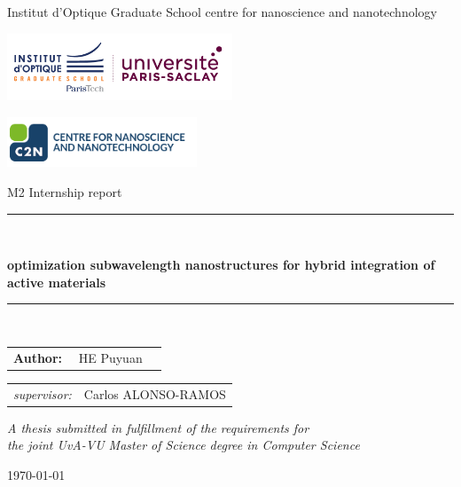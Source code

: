 \message{ !name(reporter.tex)}\documentclass[]{article}
\begin{document}


\thispagestyle{empty}

\begin{center}

\hspace*{0.9cm} Institut d'Optique Graduate School \hspace*{1.8cm} centre for nanoscience and nanotechnology 

\vspace{1mm}

\hspace*{-6.5cm}\includegraphics[height=20mm]{figures/logo/iogs.png}

\vspace*{-1.8cm}\hspace*{7.5cm}\includegraphics[height=15mm]{figures/logo/c2n.png}

\vspace{2cm}

{\Large M2 Internship report}

\vspace*{1.5cm}

\rule{.9\linewidth}{.6pt}\\[0.4cm]
{\huge \bfseries optimization subwavelength nanostructures for hybrid integration of active materials\par}\vspace{0.4cm}
\rule{.9\linewidth}{.6pt}\\[1.5cm]

\vspace*{2mm}

{\Large
\begin{tabular}{l}
{\bf Author:} ~~HE Puyuan~~
\end{tabular}
}

\vspace*{2cm}

\begin{tabular}{ll}
{\it supervisor:}   & Carlos ALONSO-RAMOS \\
\end{tabular}

\vspace*{2.5cm}

\textit{A thesis submitted in fulfillment of the requirements for\\ the joint UvA-VU Master of Science degree in Computer Science}

\vspace*{1.8cm}

\today\\[4cm] %

\end{center}
\end{document}
